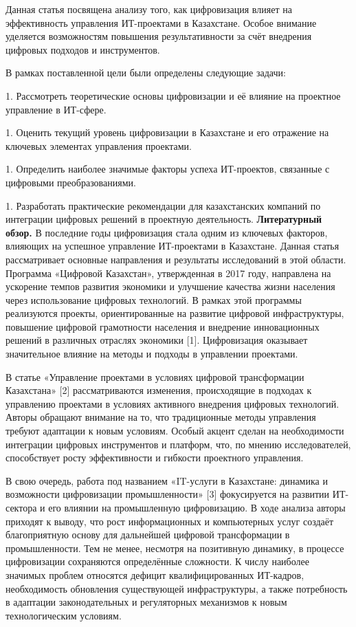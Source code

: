 Данная статья посвящена анализу того, как цифровизация влияет на
эффективность управления ИТ-проектами в Казахстане. Особое внимание
уделяется возможностям повышения результативности за счёт внедрения
цифровых подходов и инструментов.

В рамках поставленной цели были определены следующие задачи:


1. Рассмотреть теоретические основы цифровизации и её влияние на
проектное управление в ИТ-сфере.

1. Оценить текущий уровень цифровизации в Казахстане и его отражение на
ключевых элементах управления проектами.

1. Определить наиболее значимые факторы успеха ИТ-проектов, связанные с
цифровыми преобразованиями.

1. Разработать практические рекомендации для казахстанских компаний по
интеграции цифровых решений в проектную деятельность.
{\bfseries Литературный обзор.} В последние годы цифровизация стала одним
из ключевых факторов, влияющих на успешное управление ИТ-проектами в
Казахстане. Данная статья рассматривает основные направления и
результаты исследований в этой области. Программа «Цифровой Казахстан»,
утвержденная в 2017 году, направлена на ускорение темпов развития
экономики и улучшение качества жизни населения через использование
цифровых технологий. В рамках этой программы реализуются проекты,
ориентированные на развитие цифровой инфраструктуры, повышение цифровой
грамотности населения и внедрение инновационных решений в различных
отраслях экономики {[}1{]}. Цифровизация оказывает значительное влияние
на методы и подходы в управлении проектами.

В статье «Управление проектами в условиях цифровой трансформации
Казахстана» {[}2{]} рассматриваются изменения, происходящие в подходах к
управлению проектами в условиях активного внедрения цифровых технологий.
Авторы обращают внимание на то, что традиционные методы управления
требуют адаптации к новым условиям. Особый акцент сделан на
необходимости интеграции цифровых инструментов и платформ, что, по
мнению исследователей, способствует росту эффективности и гибкости
проектного управления.

В свою очередь, работа под названием «IT-услуги в Казахстане: динамика и
возможности цифровизации промышленности» {[}3{]} фокусируется на
развитии ИТ-сектора и его влиянии на промышленную цифровизацию. В ходе
анализа авторы приходят к выводу, что рост информационных и компьютерных
услуг создаёт благоприятную основу для дальнейшей цифровой трансформации
в промышленности. Тем не менее, несмотря на позитивную динамику, в
процессе цифровизации сохраняются определённые сложности. К числу
наиболее значимых проблем относятся дефицит квалифицированных ИТ-кадров,
необходимость обновления существующей инфраструктуры, а также
потребность в адаптации законодательных и регуляторных механизмов к
новым технологическим условиям.

